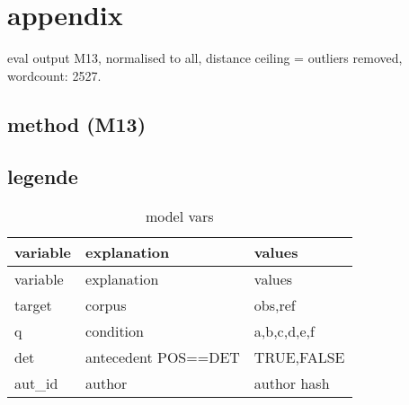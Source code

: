 \documentclass[
  12pt,
  oneside]{book}
\begin{document}
\chapter{appendix}\label{appendix}

eval output M13, normalised to all, distance ceiling = outliers removed, wordcount: 2527.

\section{method (M13)}\label{method-m13}

\section{legende}\label{legende}

\begin{longtable}[]{@{}
  >{\raggedright\arraybackslash}p{}
  >{\raggedright\arraybackslash}p{}
  >{\raggedright\arraybackslash}p{}@{}}
\caption{\label{tab:legend}model vars}\tabularnewline
\toprule\noalign{}
\begin{minipage}[b]{\linewidth}\raggedright
variable
\end{minipage} & \begin{minipage}[b]{\linewidth}\raggedright
explanation
\end{minipage} & \begin{minipage}[b]{\linewidth}\raggedright
values
\end{minipage} \\
\midrule\noalign{}
\endfirsthead
\toprule\noalign{}
\begin{minipage}[b]{\linewidth}\raggedright
variable
\end{minipage} & \begin{minipage}[b]{\linewidth}\raggedright
explanation
\end{minipage} & \begin{minipage}[b]{\linewidth}\raggedright
values
\end{minipage} \\
\midrule\noalign{}
\endhead
\bottomrule\noalign{}
\endlastfoot
target & corpus & obs,ref \\
q & condition & a,b,c,d,e,f \\
det & antecedent POS==DET & TRUE,FALSE \\
aut\_id & author & author hash \\

\end{longtable}
\end{document}
